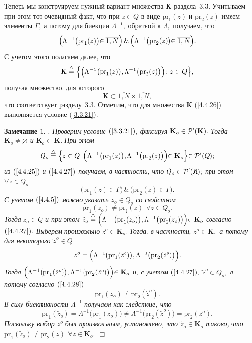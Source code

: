 \documentclass[11pt,twoside,openany]{report}
\newcommand{\bfn}{\begin{equation}}
\newcommand{\efn}{\end{equation}}
\newcommand{\df}{\stackrel{\triangle}{=}}
\newcommand{\ov}{\overline}
\newcounter{theo}
\newcounter{zam}
\newtheorem{zam}{Замечание}[section]
\newcommand{\La}{\Lambda}
\newcommand{\fa}{\forall}
\newcommand{\cp}{{\cal P}}
\newcommand{\emp}{\varnothing}
\begin{document}
{Теперь мы конструируем нужный вариант множества $\mathbf{K}$ раздела~3.3.
Учитываем при этом тот очевидный факт, что при $z\in Q$ в виде $\mathrm{pr}_1(z)$
и $\mathrm{pr}_2(z)$ имеем  элементы $\Gamma,$ а потому для биекции $\La^{-1},$
обратной к $\La,$ получаем, что
$$
\Bigl(\La^{-1}\bigl(\mathrm{pr}_1(z)\bigl)\in \ov{1,N}\Bigl)\,\&\,
\Bigl(\La^{-1}\bigl(\mathrm{pr}_2(z)\bigl)\in \ov{1,N}\Bigl).
$$
С учетом этого полагаем далее, что
\bfn\label{4.4.26}
\mathbf{K}\df \Bigl\{\Bigl(\La^{-1}\bigl(\mathrm{pr}_1(z)\bigl),\La^{-1}
\bigl(\mathrm{pr}_2(z)\bigl)\Bigl):\,z\in Q\Bigl\},
\efn
получая множество, для которого
$$
\mathbf{K}\subset \ov{1,N} \times \ov{1,N},
$$
что соответствует разделу~3.3. Отметим, что для множества $\mathbf{K}$
(\ref{4.4.26}) выполняется условие (\ref{3.3.21}).

\begin{zam}\label{z4.4.1`}. Проверим условие $(\ref{3.3.21})$, фиксируя
$\mathbf{K}_o\in \cp^\prime(\mathbf{K}).$ Тогда $\mathbf{K}_o\neq \emp$ и
$\mathbf{K}_o\subset \mathbf{K}.$ При этом
\bfn\label{4.4.27}
Q_o \df \Bigl\{z\in Q \bigl|\,\Bigl(\La^{-1}\bigl(\mathrm{pr}_1(z)\bigl),
\La^{-1}\bigl(\mathrm{pr}_2(z)\bigl)\Bigl)\in \mathbf{K}_o\Bigl\}\in \cp^\prime(Q);
\efn
из $(\ref{4.4.25})$ и $(\ref{4.4.27})$ получаем, в частности, что $Q_o\in
\cp^\prime(\mathfrak{K});$ при этом $\fa z\in Q_o$
$$
\bigl(\mathrm{pr}_1(z) \in \Gamma\bigl)\,\&\,\bigl(\mathrm{pr}_2(z) \in \Gamma\bigl).
$$
С учетом $(\ref{4.4.5})$ можно указать $z_o\in Q_o$ со свойством
\bfn\label{4.4.28}\mathrm{pr}_1(z_o)\neq \mathrm{pr}_2(z)\ \ \fa z\in Q_o.
\efn
Тогда $z_o\in Q$ и при этом $\tilde{z}_o \df \Bigl(\La^{-1}\bigl(\mathrm{pr}_1(z_o)
\bigl),\La^{-1}\bigl(\mathrm{pr}_2(z_o)\bigl)\Bigl)\in \mathbf{K}_o$ согласно
$(\ref{4.4.27}).$ Выберем произвольно $z^o\in \mathbf{K}_o.$ Тогда, в
частности, $z^o\in \mathbf{K},$ а потому для некоторого $\tilde{z}^o\in Q$
$$
z^o = \Bigl(\La^{-1}\bigl(\mathrm{pr}_1(\tilde{z}^o)\bigl), \La^{-1}\bigl(\mathrm{pr}_2(\tilde{z}^o)
\bigl)\Bigl).
$$
Тогда $\Bigl(\La^{-1}\bigl(\mathrm{pr}_1(\tilde{z}^o)\bigl),\La^{-1}
\bigl(\mathrm{pr}_2(\tilde{z}^o)\bigl)
\Bigl)\in \mathbf{K}_o$ и, с учетом $(\ref{4.4.27}),$ $\tilde{z}^o\in Q_o,$ а потому согласно
$(\ref{4.4.28})$
$$
\mathrm{pr}_1(z_o) \neq \mathrm{pr}_2(\tilde{z}^o).
$$
В силу биективности $\La^{-1}$ получаем как следствие, что
$$
\mathrm{pr}_1(\tilde{z}_o) = \La^{-1}\bigl(\mathrm{pr}_1(z_o)\bigl)
\neq \La^{-1}\bigl(\mathrm{pr}_2(\tilde{z}^o)\bigl)= \mathrm{pr}_2(z^o).
$$
Поскольку выбор $z^o$ был произвольным, установлено, что $\tilde{z}_o\in \mathbf{K}_o$ таково, что
$\mathrm{pr}_1(\tilde{z}_o)  \neq \mathrm{pr}_2(z)\ \ \fa z\in \mathbf{K}_o.$ \hfill $\Box$
\end{zam}

}
\end{document}
